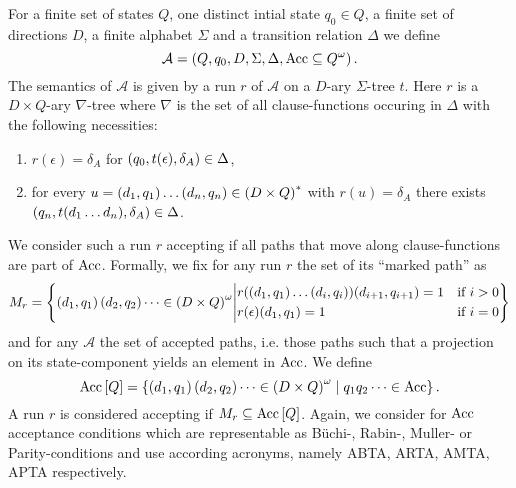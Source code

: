 \begin{definition}
  For a finite set of states $Q$, one distinct intial state $q_{0}\in Q$, a
  finite set of directions $D$, a finite alphabet $\Sigma$ and a transition
  relation $\Delta$ we define 
  \begin{equation*}
    \mathcal{A} = \left(Q, q_{0}, D, \Sigma, \Delta, \operatorname{Acc}\subseteq Q^{\omega}\right).
  \end{equation*}
  The semantics of $\mathcal{A}$ is given by a run $r$ of $\mathcal{A}$ on a
  $D$-ary $\Sigma$-tree $t$. Here $r$ is a $D\times Q$-ary $\nabla$-tree where 
  $\nabla$ is the set of all clause-functions occuring in $\Delta$ with the 
  following necessities:
  \begin{enumerate}
    \item $r(\epsilon) = \delta_{A}$ for 
      $\left(q_{0}, t(\epsilon), \delta_{A}\right)\in\Delta$,
    \item for every $u = \left(d_{1}, q_{1}\right)\dots\left(d_{n}, q_{n}\right)\in
      \left(D\times Q\right)^{*}$ with $r(u) = \delta_{A}$ there exists
      $\left(q_{n}, t(d_{1}\dots d_{n}), \delta_{A}\right)\in\Delta$.
  \end{enumerate}
  We consider such a run $r$ accepting if all paths that move along 
  clause-functions are part of $\operatorname{Acc}$. Formally, we fix for any run $r$ the set 
  of its \enquote{marked path} as
  \begin{equation*}
  M_{r} = \left\{
    \left(d_{1}, q_{1}\right)\left(d_{2}, q_{2}\right)\dots\in
    \left(D\times Q\right)^{\omega}\middle|
    \begin{aligned}
      &r(\left(d_{1}, q_{1}\right)\dots
      \left(d_{i}, q_{i}\right))(d_{i+1}, q_{i+1}) = 1&\text{if }i>0\\
      &r(\epsilon)(d_{1}, q_{1}) = 1&\text{if }i=0
    \end{aligned}
    \right\}
  \end{equation*}
  and for any $\mathcal{A}$ the set of accepted paths, i.e. those paths such 
  that a projection on its state-component yields an element in $\operatorname{Acc}$. We 
  define
  \begin{equation*}
    \operatorname{Acc}\left[Q\right] = \left\{
      \left(d_{1}, q_{1}\right)\left(d_{2}, q_{2}\right)\dots\in
      \left(D\times Q\right)^{\omega}\mid q_{1}q_{2}\dots\in\operatorname{Acc}
    \right\}.
  \end{equation*}
  A run $r$ is considered accepting if $M_{r}\subseteq\operatorname{Acc}\left[Q\right]$.
  Again, we consider for $\operatorname{Acc}$ acceptance conditions which are representable
  as Büchi-, Rabin-, Muller- or Parity-conditions and use according acronyms,
  namely \acs{ABTA}, \acs{ARTA}, \acs{AMTA}, \acs{APTA} respectively.
      
\end{definition}
